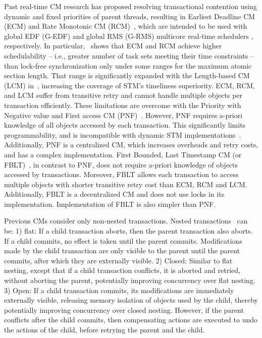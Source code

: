 \documentclass[10pt, conference, compsocconf]{IEEEtran}
\begin{document}
Past real-time CM research 
has proposed resolving transactional contention using dynamic and fixed priorities of parent threads, resulting in Earliest Deadline CM (ECM) and Rate Monotonic CM (RCM)~\cite{6045438,stmconcurrencycontrol:emsoft11,lcmdac2012}, which are intended to be used with global EDF (G-EDF) and global RMS (G-RMS) multicore real-time schedulers \cite{Davis:2011:SHR:1978802.1978814}, respectively.
In particular,~\cite{stmconcurrencycontrol:emsoft11} shows that ECM and RCM achieve higher schedulability -- i.e., greater number of task sets meeting their time constraints -- than lock-free synchronization only under some ranges for the maximum atomic section length. That range is significantly expanded with the Length-based CM (LCM) in~\cite{lcmdac2012}, increasing the coverage of STM's timeliness superiority. ECM, RCM, and LCM suffer from transitive retry and cannot handle multiple objects per transaction efficiently. These limitations are overcome with the Priority with Negative value and First access CM (PNF)~\cite{pnf_dac_asp,shambake_phd_proposal}. However, PNF requires a-priori knowledge of all objects accessed by each transaction. This significantly limits programmability, and is incompatible with dynamic STM implementations~\cite{Herlihy:2003:STM:872035.872048}. Additionally, PNF is a centralized CM, which increases overheads and retry costs, and has a complex implementation. First Bounded, Last Timestamp CM (or FBLT)~\cite{fblt}, in contrast to PNF, does not require a-priori knowledge of objects accessed by transactions. Moreover, FBLT allows each transaction to access multiple objects with shorter transitive retry cost than ECM, RCM and LCM. Additionally, FBLT is a decentralized CM and does not use locks in its implementation. Implementation of FBLT is also simpler than PNF.

Previous CMs consider only non-nested transactions. Nested transactions~\cite{Turcu:2012:OND:2367589.2367601,turcu2012closed} can be: 1) flat: If a child transaction aborts, then the parent transaction also aborts. If a child commits, no effect is taken until the parent commits. Modifications made by the child transaction are only visible to the parent until the parent commits, after which they are externally visible. 2) Closed: Similar to flat nesting, except that if a child transaction conflicts, it is aborted and retried, without aborting the parent, potentially improving concurrency over flat nesting. 3) Open: If a child transaction commits, its modifications are immediately externally visible, releasing memory isolation of objects used by the child, thereby potentially improving concurrency over closed nesting. However, if the parent conflicts after the child commits, then compensating actions are executed to undo the actions of the child, before retrying the parent and the child.
\end{document}
